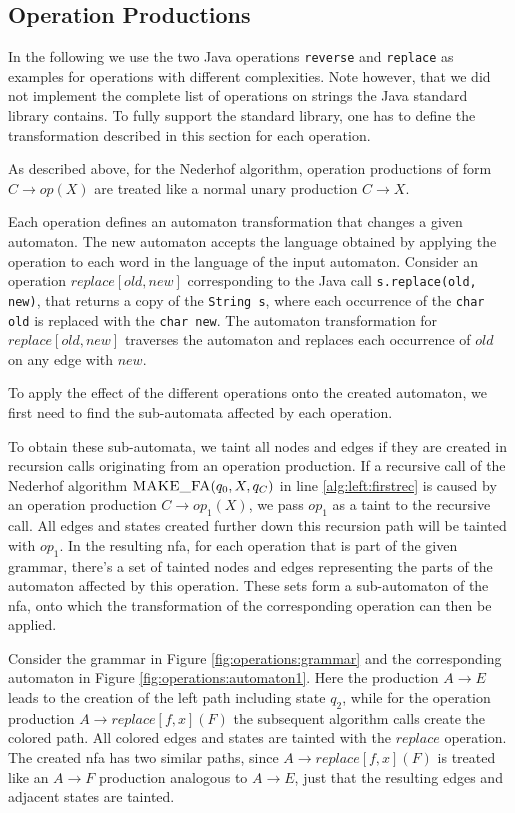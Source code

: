 \subsection{Operation Productions}\label{sec:opProduction}

In the following we use the two Java operations \lstinline|reverse| and \lstinline|replace| as examples for operations with different complexities. Note however, that we did not implement the complete list of operations on strings the Java standard library contains. To fully support the standard library, one has to define the transformation described in this section for each operation. 

As described above, for the Nederhof algorithm, operation productions of form $C \rightarrow op(X)$ are treated like a normal unary production $C \rightarrow X$.

Each operation defines an automaton transformation that changes a given automaton.
The new automaton accepts the language obtained by applying the operation to each word in the language of the input automaton.
Consider an operation $replace[old, new]$ corresponding to the Java call \lstinline|s.replace(old, new)|, that returns a copy of the \lstinline|String s|, where each occurrence of the \lstinline|char old| is replaced with the \lstinline|char new|.
The automaton transformation for $replace[old, new]$ traverses the automaton and replaces each occurrence of $old$ on any edge with $new$.

To apply the effect of the different operations onto the created automaton, we first need to find the sub-automata affected by each operation.

To obtain these sub-automata, we taint all nodes and edges if they are created in recursion calls originating from an operation production. 
If a recursive call of the Nederhof algorithm $\textproc{MAKE\_FA}(q_0, X, q_C)$ in line \ref{alg:left:firstrec} is caused by an operation production $C \rightarrow op_1(X)$, we pass $op_1$ as a taint to the recursive call. All edges and states created further down this recursion path will be tainted with $op_1$. In the resulting \ac{nfa}, for each operation that is part of the given grammar, there's a set of tainted nodes and edges representing the parts of the automaton affected by this operation. These sets form a sub-automaton of the \ac{nfa}, onto which the transformation of the corresponding operation can then be applied.

Consider the grammar in Figure \ref{fig:operations:grammar} and the corresponding automaton in Figure \ref{fig:operations:automaton1}. Here the production $A \rightarrow E$ leads to the creation of the left path including state $q_2$, while for the operation production $A \rightarrow replace[f,x](F)$ the subsequent algorithm calls create the colored path. All colored edges and states are tainted with the $replace$ operation. The created \ac{nfa} has two similar paths, since $A \rightarrow replace[f,x](F)$ is treated like an $A \rightarrow F$ production analogous to $A \rightarrow E$, just that the resulting edges and adjacent states are tainted.

